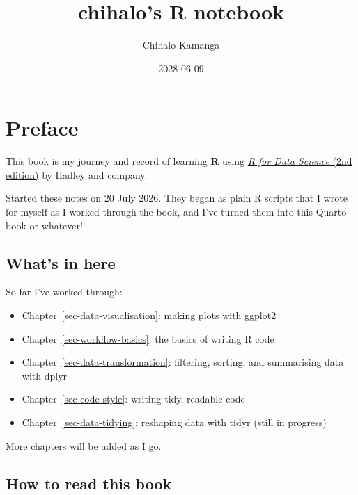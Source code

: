 \documentclass[
  letterpaper,
  DIV=11,
  numbers=noendperiod]{scrreprt}
\title{chihalo's R notebook}
\author{Chihalo Kamanga}
\date{2028-06-09}
\providecommand{\tightlist}{%
  \setlength{\itemsep}{0pt}\setlength{\parskip}{0pt}}
\renewcommand*\contentsname{Table of contents}
\newcommand\contentsname{Table of contents}
\begin{document}
\maketitle

\renewcommand*\contentsname{Table of contents}
{
\setcounter{tocdepth}{2}
\tableofcontents
}


\chapter*{Preface}\label{preface}


This book is my journey and record of learning \textbf{R} using
\href{https://r4ds.hadley.nz/}{\emph{R for Data Science} (2nd edition)}
by Hadley and company.

Started these notes on 20 July 2026. They began as plain R scripts that
I wrote for myself as I worked through the book, and I've turned them
into this Quarto book or whatever!

\section*{What's in here}\label{whats-in-here}


So far I've worked through:

\begin{itemize}
\tightlist
\item
  Chapter~\ref{sec-data-visualisation}: making plots with ggplot2
\item
  Chapter~\ref{sec-workflow-basics}: the basics of writing R code
\item
  Chapter~\ref{sec-data-transformation}: filtering, sorting, and
  summarising data with dplyr
\item
  Chapter~\ref{sec-code-style}: writing tidy, readable code
\item
  Chapter~\ref{sec-data-tidying}: reshaping data with tidyr (still in
  progress)
\end{itemize}

More chapters will be added as I go.

\section*{How to read this book}\label{how-to-read-this-book}
\end{document}
